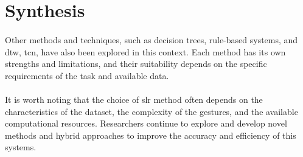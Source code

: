 \section{Synthesis}
\paragraph{}
Other methods and techniques, such as decision trees, rule-based systems, and \ac{dtw}, \ac{tcn}, have also been explored in this context. Each method has its own strengths and limitations, and their suitability depends on the specific requirements of the task and available data.
\paragraph{}
It is worth noting that the choice of \ac{slr} method often depends on the characteristics of the dataset, the complexity of the gestures, and the available computational resources. Researchers continue to explore and develop novel methods and hybrid approaches to improve the accuracy and efficiency of this systems.
